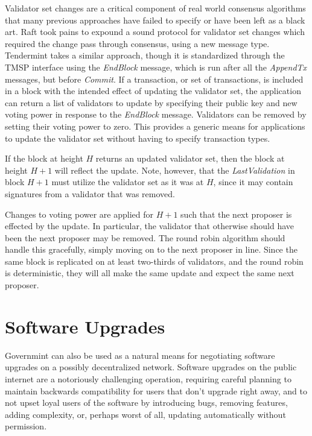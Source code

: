 Validator set changes are a critical component of real world consensus algorithms that many previous approaches have failed to specify 
or have been left as a black art. 
Raft took pains to expound a sound protocol for validator set changes which required the change pass through consensus, 
using a new message type.
Tendermint takes a similar approach, though it is standardized through the TMSP interface using the \emph{EndBlock} message,
which is run after all the \emph{AppendTx} messages, but before \emph{Commit}.
If a transaction, or set of transactions, is included in a block with the intended effect of updating the validator set,
the application can return a list of validators to update by specifying their public key and new voting power 
in response to the \emph{EndBlock} message.
Validators can be removed by setting their voting power to zero.
This provides a generic means for applications to update the validator set without having to specify transaction types.

If the block at height $H$ returns an updated validator set, 
then the block at height $H+1$ will reflect the update.
Note, however, that the \emph{LastValidation} in block $H+1$
must utilize the validator set as it was at $H$, 
since it may contain signatures from a validator that was removed.

Changes to voting power are applied for $H+1$ such that the next proposer 
is effected by the update. 
In particular, the validator that otherwise should have been the next proposer may be removed.
The round robin algorithm should handle this gracefully, simply moving on to the next proposer in line.
Since the same block is replicated on at least two-thirds of validators, 
and the round robin is deterministic,
they will all make the same update and expect the same next proposer.

\section{Software Upgrades}

Governmint can also be used as a natural means for negotiating software upgrades on a possibly decentralized network.
Software upgrades on the public internet are a notoriously challenging operation,
requiring careful planning to maintain backwards compatibility for users that don't upgrade right away,
and to not upset loyal users of the software by introducing bugs, removing features, adding complexity, or,
perhaps worst of all, updating automatically without permission.

